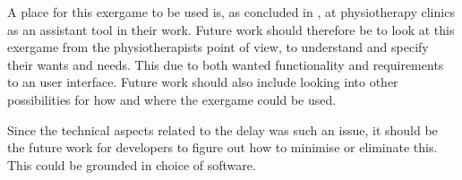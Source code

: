 A place for this exergame to be used is, as concluded in \cite{project}, at physiotherapy clinics as an assistant tool in their work. Future work should therefore be to look at this exergame from the physiotherapists point of view, to understand and specify their wants and needs. This due to both wanted functionality and requirements to an user interface. Future work should also include looking into other possibilities for how and where the exergame could be used.   

Since the technical aspects related to the delay was such an issue, it should be the future work for developers to figure out how to minimise or eliminate this. This could be grounded in choice of software. 
